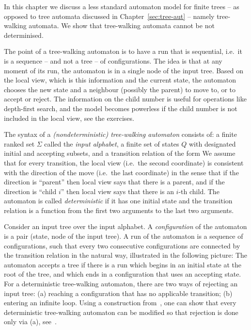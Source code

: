 \label{sec:twa}

\newcommand{\dfs}{search\xspace}
In this chapter we discuss a less standard automaton model for finite trees -- as opposed to tree automata discussed in Chapter~\ref{sec:tree-aut} -- namely tree-walking automata. We show  that tree-walking automata cannot be not determinised.

The point of a tree-walking automaton is to have a run that is  sequential, i.e.~it  is a sequence -- and not a tree -- of configurations. The idea is that at any  moment of its run, the automaton is in a single node of the input tree. Based on the local view, which is this information 
and the current state,  
 the automaton chooses the new state and a neighbour (possibly  the parent) to move to, or to accept or reject. The information on the child number is useful for operations like depth-first search, and the model becomes powerless if the child number is not included in the local view, see the exercises. 

\begin{definition}
The syntax of a  \emph{(nondeterministic) tree-walking automaton} consists of: a finite ranked set $\Sigma$ called the \emph{input alphabet}, a finite set of states $Q$ with designated initial and accepting subsets, and a transition relation of the form 
		We assume that for every transition, the local view (i.e.~the second coordinate) is consistent with the direction of the move (i.e.~the last coordinate)  in the sense that if the direction  is ``parent'' then local view says that there is a parent,  and if the direction is ``child $i$'' then local view says that there is an $i$-th child.
The automaton is called \emph{deterministic} if it has one initial state and  the  transition relation is  a function from the first two arguments to the last two arguments.
\end{definition}

 Consider an input tree over the input alphabet. A \emph{configuration} of the automaton is a pair (state, node of the input tree).   A run of the automaton is a sequence of configurations, such that every two consecutive configurations are connected by the transition relation in the natural way, illustrated in the following picture: 
The automaton accepts a tree if there is a run which begins in an  initial state at the root of the tree, and which ends in a configuration that uses an accepting state.  For a deterministic tree-walking automaton,  there are two ways of rejecting an input tree: (a) reaching a configuration that  has no applicable transition; (b) entering an infinite loop. Using a construction from~\cite[Theorem 1]{Sipser:1980fp}, one can show that every deterministic tree-walking automaton can be modified so that rejection is done only via (a), see~\cite[Proposition 1]{Muscholl:2006cl}.


